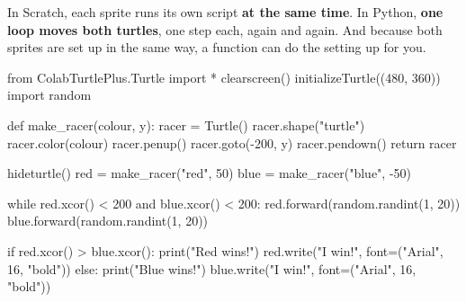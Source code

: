 In Scratch, each sprite runs its own script \textbf{at the same time}. In Python, \textbf{one loop moves both turtles}, one step each, again and again. And because both sprites are set up in the same way, a function can do the setting up for you.


\begin{typethis}
from ColabTurtlePlus.Turtle import *
clearscreen()
initializeTurtle((480, 360))
import random

def make_racer(colour, y):
    racer = Turtle()
    racer.shape("turtle")
    racer.color(colour)
    racer.penup()
    racer.goto(-200, y)
    racer.pendown()
    return racer

hideturtle()
red = make_racer("red", 50)
blue = make_racer("blue", -50)

while red.xcor() < 200 and blue.xcor() < 200:
    red.forward(random.randint(1, 20))
    blue.forward(random.randint(1, 20))

if red.xcor() > blue.xcor():
    print("Red wins!")
    red.write("I win!", font=("Arial", 16, "bold"))
else:
    print("Blue wins!")
    blue.write("I win!", font=("Arial", 16, "bold"))
\end{typethis}


